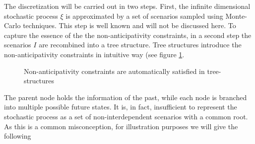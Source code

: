 \documentclass[a4paper, 12pt] {article}
\begin{document}
The discretization will be carried out in two steps. 
First, the infinite dimensional stochastic process $\xi$ is approximated by a set of scenarios sampled using Monte-Carlo techniques. 
This step is well known and will not be discussed here. 
To capture the essence of the the non-anticipativity constraints, in a second step the scenarios $I$ are recombined into a tree structure. 
Tree structures introduce the non-anticipativity constraints in intuitive way (see figure \ref{fig:NAC-and-trees}.
\begin{figure}
  \centering
  \caption{Non-anticipativity constraints are automatically satisfied in tree-structures}
  \label{fig:NAC-and-trees}
\end{figure}
The parent node holds the information of the past, while each node is branched into multiple possible future states. 
It is, in fact, insufficient to represent the stochastic process as a set of non-interdependent scenarios with a common root. 
As this is a common misconception, for illustration purposes we will give the following
\end{document}
